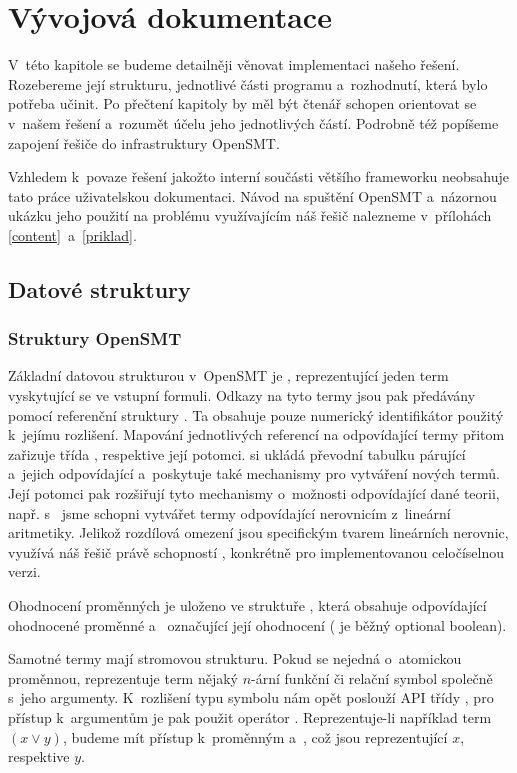 \chapter{Vývojová dokumentace}
V~této kapitole se budeme detailněji věnovat implementaci našeho řešení. Rozebereme její strukturu, jednotlivé části programu a~rozhodnutí, která bylo potřeba učinit. Po přečtení kapitoly by měl být čtenář schopen orientovat se v~našem řešení a~rozumět účelu jeho jednotlivých částí. Podrobně též popíšeme zapojení řešiče do infrastruktury OpenSMT.

Vzhledem k~povaze řešení jakožto interní součásti většího frameworku neobsahuje tato práce uživatelskou dokumentaci. Návod na spuštění OpenSMT a~názornou ukázku jeho použití na problému využívajícím náš řešič nalezneme v~přílohách \ref{content}~a~\ref{priklad}.
\section{Datové struktury}\label{data}

\subsection*{Struktury OpenSMT}
Základní datovou strukturou v~OpenSMT je , reprezentující jeden term vyskytující se ve vstupní formuli. Odkazy na tyto termy jsou pak předávány pomocí referenční struktury . Ta obsahuje pouze numerický identifikátor použitý k~jejímu rozlišení. Mapování jednotlivých referencí na odpovídající termy přitom zařizuje třída , respektive její potomci.  si ukládá převodní tabulku párující  a~jejich odpovídající  a~poskytuje také mechanismy pro vytváření nových termů. Její potomci pak rozšiřují tyto mechanismy o~možnosti odpovídající dané teorii, např. s~ jsme schopni vytvářet termy odpovídající nerovnicím z~lineární aritmetiky. Jelikož rozdílová omezení jsou specifickým tvarem lineárních nerovnic, využívá náš řešič právě schopností , konkrétně  pro implementovanou celočíselnou verzi.

Ohodnocení proměnných je uloženo ve struktuře , která obsahuje  odpovídající ohodnocené proměnné a~ označující její ohodnocení ( je běžný optional boolean).

Samotné termy mají stromovou strukturu. Pokud se nejedná o~atomickou proměnnou, reprezentuje term nějaký $n$-ární funkční či relační symbol společně s~jeho argumenty. K~rozlišení typu symbolu nám opět poslouží API třídy , pro přístup k~argumentům je pak použit operátor \icode{[]}. Reprezentuje-li například  term $(x \lor y)$, budeme mít přístup k~proměnným  a~, což jsou  reprezentující $x$, respektive $y$. 

